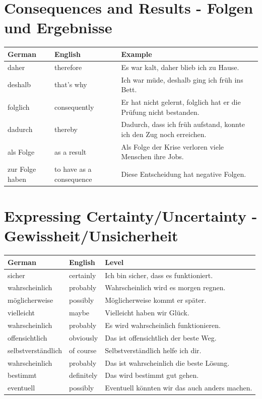 \section{Consequences and Results - Folgen und Ergebnisse}
\label{sec:Folgen}

\begin{center}
\begin{tabular}{|l|p{7cm}|p{5cm}|}
\hline
German & English & Example \\ \hline
daher & therefore & Es war kalt, daher blieb ich zu Hause. \\ \hline
deshalb & that's why & Ich war müde, deshalb ging ich früh ins Bett. \\ \hline
folglich & consequently & Er hat nicht gelernt, folglich hat er die Prüfung nicht bestanden. \\ \hline
dadurch & thereby & Dadurch, dass ich früh aufstand, konnte ich den Zug noch erreichen. \\ \hline
als Folge & as a result & Als Folge der Krise verloren viele Menschen ihre Jobs. \\ \hline
zur Folge haben & to have as a consequence & Diese Entscheidung hat negative Folgen. \\ \hline
\end{tabular}
\end{center}

\section{Expressing Certainty/Uncertainty - Gewissheit/Unsicherheit}
\label{sec:Gewissheit}

\begin{center}
\begin{tabular}{|l|p{7cm}|p{5cm}|}
\hline
German & English & Level \\ \hline
sicher & certainly & Ich bin sicher, dass es funktioniert. \\ \hline
wahrscheinlich & probably & Wahrscheinlich wird es morgen regnen. \\ \hline
möglicherweise & possibly & Möglicherweise kommt er später. \\ \hline
vielleicht & maybe & Vielleicht haben wir Glück. \\ \hline
wahrscheinlich & probably & Es wird wahrscheinlich funktionieren. \\ \hline
offensichtlich & obviously & Das ist offensichtlich der beste Weg. \\ \hline
selbstverständlich & of course & Selbstverständlich helfe ich dir. \\ \hline
wahrscheinlich & probably & Das ist wahrscheinlich die beste Lösung. \\ \hline
bestimmt & definitely & Das wird bestimmt gut gehen. \\ \hline
eventuell & possibly & Eventuell könnten wir das auch anders machen. \\ \hline
\end{tabular}
\end{center}

\chapterend